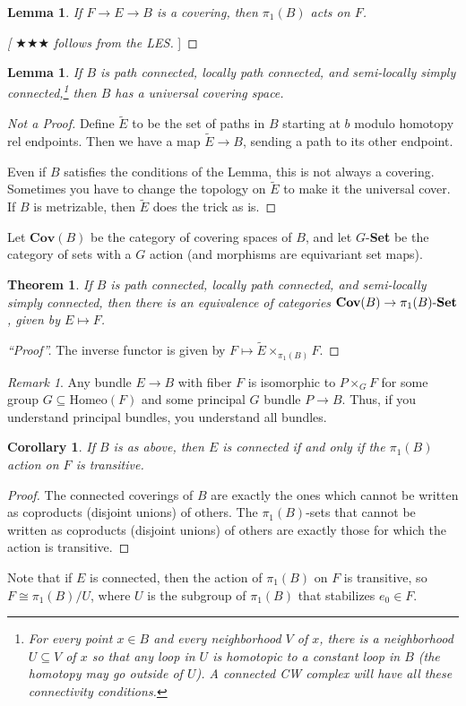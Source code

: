 \documentclass[12pt]{article}
\makeatletter
\theoremstyle{plain}
\newtheorem{theorem}[equation]{Theorem}
\newtheorem{lemma}[equation]{Lemma}
\newtheorem{corollary}[equation]{Corollary}
\theoremstyle{definition}
\theoremstyle{remark}
\newtheorem{remark}[equation]{Remark}
\newcommand{\anton}[1]{[[\index{"!@notes and corrections}
                        \ensuremath{\bigstar\bigstar\bigstar} #1]]}
\makeatother
\begin{document}
 \begin{lemma}
   If $F\to E\to B$ is a covering, then $\pi_1(B)$ acts on $F$.
 \end{lemma}
 \begin{proof}
   \anton{follows from the LES}
 \end{proof}
 \begin{lemma}
   If $B$ is path connected, locally path connected, and semi-locally simply
   connected,\footnote{For every point $x\in B$ and every neighborhood $V$ of $x$, there
   is a neighborhood $U\subseteq V$ of $x$ so that any loop in $U$ is homotopic to a
   constant loop \emph{in $B$} (the homotopy may go outside of $U$). A connected CW
   complex will have all these connectivity conditions.} then $B$ has a universal
   covering space.
 \end{lemma}
 \begin{proof}[Not a Proof]
   Define $\tilde E$ to be the set of paths in $B$ starting at $b$ modulo homotopy rel
   endpoints. Then we have a map $\tilde E\to B$, sending a path to its other endpoint.

   Even if $B$ satisfies the conditions of the Lemma, this is not always a covering.
   Sometimes you have to change the topology on $\tilde E$ to make it the universal
   cover. If $B$ is metrizable, then $\tilde E$ does the trick as is.
 \end{proof}
 Let $\textbf{Cov}(B)$ be the category of covering spaces of $B$, and let
 $G$-\textbf{Set} be the category of sets with a $G$ action (and morphisms are
 equivariant set maps).
 \begin{theorem}
   If $B$ is path connected, locally path connected, and semi-locally simply connected,
   then there is an equivalence of categories $\textrm{\bf Cov}(B)\to
   \pi_1(B)\textrm{-\bf Set}$, given by $E\mapsto F$.
 \end{theorem}
 \begin{proof}[``Proof'']
   The inverse functor is given by $F\mapsto \tilde E\times_{\pi_1(B)} F$.
 \end{proof}
 \begin{remark}
   Any bundle $E\to B$ with fiber $F$ is isomorphic to $P\times_G F$ for some group
   $G\subseteq \text{Homeo}(F)$ and some principal $G$ bundle $P\to B$. Thus, if you
   understand principal bundles, you understand all bundles.
 \end{remark}
 \begin{corollary}
   If $B$ is as above, then $E$ is connected if and only if the $\pi_1(B)$ action on $F$
   is transitive.
 \end{corollary}
 \begin{proof}
   The connected coverings of $B$ are exactly the ones which cannot be written as
   coproducts (disjoint unions) of others. The $\pi_1(B)$-sets that cannot be written as
   coproducts (disjoint unions) of others are exactly those for which the action is
   transitive.
 \end{proof}
 Note that if $E$ is connected, then the action of $\pi_1(B)$ on $F$ is transitive, so
 $F\cong \pi_1(B)/U$, where $U$ is the subgroup of $\pi_1(B)$ that stabilizes $e_0\in F$.
\end{document}
